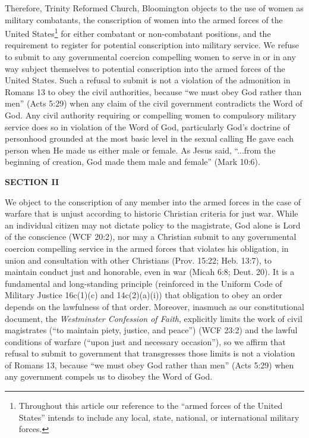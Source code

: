 \documentclass[
]{book}
\begin{document}
Therefore, Trinity Reformed Church, Bloomington objects to the use of women as military combatants, the conscription of women into the armed forces of the United States\footnote{Throughout this article our reference to the ``armed forces of the United States'' intends to include any local, state, national, or international military forces.} for either combatant or non-combatant positions, and the requirement to register for potential conscription into military service. We refuse to submit to any governmental coercion compelling women to serve in or in any way subject themselves to potential conscription into the armed forces of the United States. Such a refusal to submit is not a violation of the admonition in Romans 13 to obey the civil authorities, because ``we must obey God rather than men'' (Acts 5:29) when any claim of the civil government contradicts the Word of God. Any civil authority requiring or compelling women to compulsory military service does so in violation of the Word of God, particularly God's doctrine of personhood grounded at the most basic level in the sexual calling He gave each person when He made us either male or female. As Jesus said, ``...from the beginning of creation, God made them male and female'' (Mark 10:6).

\textbf{SECTION II}

We object to the conscription of any member into the armed forces in the case of warfare that is unjust according to historic Christian criteria for just war. While an individual citizen may not dictate policy to the magistrate, God alone is Lord of the conscience (WCF 20:2), nor may a Christian submit to any governmental coercion compelling service in the armed forces that violates his obligation, in union and consultation with other Christians (Prov. 15:22; Heb. 13:7), to maintain conduct just and honorable, even in war (Micah 6:8; Deut. 20). It is a fundamental and long-standing principle (reinforced in the Uniform Code of Military Justice 16c(1)(c) and 14c(2)(a)(i)) that obligation to obey an order depends on the lawfulness of that order. Moreover, inasmuch as our constitutional document, the \emph{Westminster Confession of Faith}, explicitly limits the work of civil magistrates (``to maintain piety, justice, and peace'') (WCF 23:2) and the lawful conditions of warfare (``upon just and necessary occasion''), so we affirm that refusal to submit to government that transgresses those limits is not a violation of Romans 13, because ``we must obey God rather than men'' (Acts 5:29) when any government compels us to disobey the Word of God.
\end{document}
